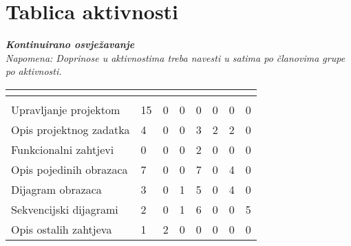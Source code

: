 		\eject
		\section*{Tablica aktivnosti}
		
			\textbf{\textit{Kontinuirano osvježavanje}}\\
			
			 \textit{Napomena: Doprinose u aktivnostima treba navesti u satima po članovima grupe po aktivnosti.}
					
			\begin{longtabu} to \textwidth {|X[7, l]|X[1, c]|X[1, c]|X[1, c]|X[1, c]|X[1, c]|X[1, c]|X[1, c]|}
								
				  &      &   &	 &	 &
				 &
				 &	 \\ \hline 
				\endfirsthead
				
			
				  &      &  &	 &
				 &	 &
				 &	 \\ \hline 
				\endhead
				
				
				\endfoot
							
				 
				\endlastfoot
				
				Upravljanje projektom 		& 15  & 0  & 0 &  0 & 0  & 0 & 0 \\ \hline
				Opis projektnog zadatka 	&  4& 0 & 0 & 3 & 2 & 2 &0 \\ \hline
				Funkcionalni zahtjevi       & 0 & 0 &0  & 2 & 0 & 0 &0  \\ \hline
				Opis pojedinih obrazaca 	&  7& 0 &  0&  7&  0& 4 & 0 \\ \hline
				Dijagram obrazaca 			&  3& 0 & 1 &  5& 0& 4 & 0 \\ \hline
				Sekvencijski dijagrami 		&  2& 0 & 1 & 6 & 0 & 0 &5  \\ \hline
				Opis ostalih zahtjeva 		&  1& 2 & 0 & 0 & 0 & 0 & 0 \\ \hline


\end{longtabu}
